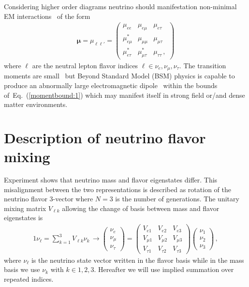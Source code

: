\documentclass[addchapnum]{ws-rv961x669} %
\newcommand{\req}[1]{Eq.~(\ref{#1})}
\begin{document}
Considering higher order diagrams neutrino should manifestation non-minimal EM interactions~\citep{Shrock:1980vy,DUNE:2020fgq} of the form
\begin{gather}
    \label{mu:1}
\boldsymbol{\mu}=\mu_{\ell\ell'}=
	\begin{pmatrix}
		\mu_{ee} & \mu_{e\mu} & \mu_{e\tau} \\
		\mu_{e\mu}^{*} & \mu_{\mu\mu} & \mu_{\mu\tau} \\
		\mu_{e\tau}^{*} & \mu_{\mu\tau}^{*} & \mu_{\tau\tau}\,,
	\end{pmatrix}
\end{gather}
where $\ell$ are the neutral lepton flavor indices $\ell\in\nu_{e},\nu_{\mu},\nu_{\tau}$. The transition moments are small~\cite{Shrock:1980vy} but  Beyond Standard Model (BSM) physics is capable to produce an abnormally large electromagnetic dipole~\citep{Lindner:2017uvt,Brdar:2020quo} within the bounds of~\req{momentbound:1} which may manifest itself in strong field or/and dense matter environments.

\section{Description of neutrino flavor mixing}
\label{sec:numass}
Experiment shows that neutrino mass and flavor eigenstates differ. This misalignment between the two representations is described as rotation of the neutrino flavor 3-vector where $N=3$ is the number of generations. The unitary mixing matrix $V_{\ell k}$ allowing the change of basis between mass and flavor eigenstates is 
\begin{alignat}{1}
	\label{basis:1} \nu_{\ell}=\sum_{k=1}^{3}V_{\ell k}\nu_{k}\,\rightarrow
	\begin{pmatrix}
		\nu_{e}\\
		\nu_{\mu}\\
		\nu_{\tau}
	\end{pmatrix}=
	\begin{pmatrix}
		V_{e1} & V_{e2} & V_{e3}\\
		V_{\mu1} & V_{\mu2} & V_{\mu3}\\
		V_{\tau1} & V_{\tau2} & V_{\tau3}
	\end{pmatrix}
	\begin{pmatrix}
		\nu_{1}\\
		\nu_{2}\\
		\nu_{3}
	\end{pmatrix}\,,
\end{alignat}
where $\nu_{\ell}$ is the neutrino state vector written in the flavor basis while in the mass basis we use $\nu_{k}$ with $k\in1,2,3$. Hereafter we will use implied summation  over repeated indices.
\end{document}
